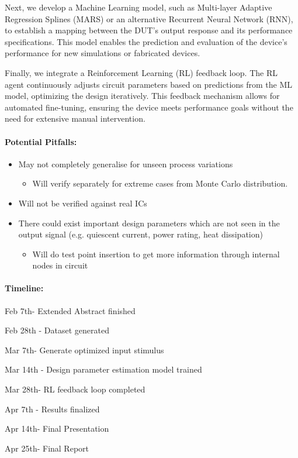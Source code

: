 \documentclass[a4paper, 12pt]{article}
\begin{document}
Next, we develop a Machine Learning model, such as Multi-layer Adaptive Regression Splines (MARS) or an alternative Recurrent Neural Network (RNN), to establish a mapping between the DUT’s output response and its performance specifications. This model enables the prediction and evaluation of the device’s performance for new simulations or fabricated devices.

Finally, we integrate a Reinforcement Learning (RL) feedback loop. The RL agent continuously adjusts circuit parameters based on predictions from the ML model, optimizing the design iteratively. This feedback mechanism allows for automated fine-tuning, ensuring the device meets performance goals without the need for extensive manual intervention.

\paragraph
{\bf Potential Pitfalls:}
\begin{itemize}
	\item May not completely generalise for unseen process variations
	\begin{itemize}
		\item Will verify separately for extreme cases from Monte Carlo distribution.
	\end{itemize}
	\item Will not be verified against real ICs
	\item There could exist important design parameters which are not seen in the output signal (e.g. quiescent current, power rating, heat dissipation)
	\begin{itemize}
		\item Will do test point insertion to get more information through internal nodes in circuit
	\end{itemize}
\end{itemize}
\paragraph
{\bf Timeline:}

Feb 7th- Extended Abstract finished

Feb 28th - Dataset generated

Mar 7th- Generate optimized input stimulus

Mar 14th - Design parameter estimation model trained

Mar 28th- RL feedback loop completed

Apr 7th - Results finalized 

Apr 14th- Final Presentation

Apr 25th- Final Report
\end{document}
